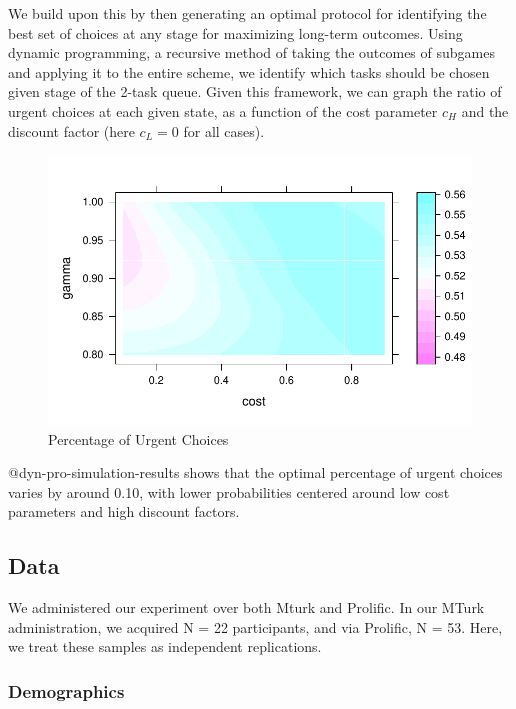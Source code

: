 We build upon this by then generating an optimal protocol for
identifying the best set of choices at any stage for maximizing
long-term outcomes. Using dynamic programming, a recursive method of
taking the outcomes of subgames and applying it to the entire scheme, we
identify which tasks should be chosen given stage of the 2-task queue.
Given this framework, we can graph the ratio of urgent choices at each
given state, as a function of the cost parameter \(c_H\) and the
discount factor (here \(c_L = 0\) for all cases).

\begin{figure}

{\centering \includegraphics{thesis-file-ppq_files/figure-latex/dyn-pro-simulation-results-1.pdf}

}

\caption{Percentage of Urgent Choices}

\end{figure}

@dyn-pro-simulation-results shows that the optimal percentage of urgent
choices varies by around 0.10, with lower probabilities centered around
low cost parameters and high discount factors.

\hypertarget{data}{%
\subsection{Data}\label{data}}

We administered our experiment over both Mturk and Prolific. In our
MTurk administration, we acquired N = 22 participants, and via Prolific,
N = 53. Here, we treat these samples as independent replications.

\hypertarget{demographics}{%
\subsubsection{Demographics}\label{demographics}}


